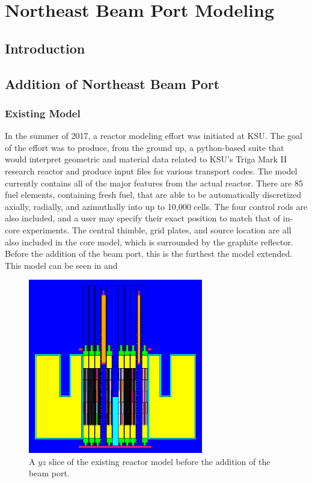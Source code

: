 
\cleardoublepage


\chapter{Northeast Beam Port Modeling}

\section{Introduction}

\section{Addition of Northeast Beam Port}


\subsection{Existing Model}

In the summer of 2017, a reactor modeling effort was initiated at KSU.
The goal of the effort was to produce, from the ground up, a python-based suite that would interpret geometric and material data related to KSU's Triga Mark II research reactor and produce input files for various transport codes.
The model currently contains all of the major features from the actual reactor.
There are 85 fuel elements, containing fresh fuel, that are able to be automatically discretized axially, radially, and azimuthally into up to 10,000 cells.
The four control rods are also included, and a user may specify their exact position to match that of in-core experiments.
The central thimble, grid plates, and source location are all also included in the core model, which is surrounded by the graphite reflector.
Before the addition of the beam port, this is the furthest the model extended.
This model can be seen in  and 

\begin{figure}[htb]
\centering
\includegraphics[height=3in]{tex/figures/existingyz.png}
\caption[Old Reactor Model $YZ$]{A $yz$ slice of the existing reactor model before the addition of the beam port.}
\label{fig:existingyz}
\end{figure}

